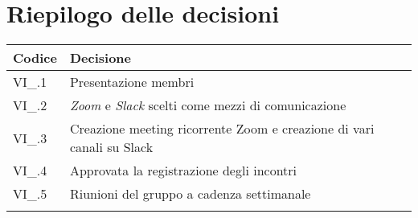 \section{Riepilogo delle decisioni \hfil}
{
	\setlength{\freewidth}{\dimexpr\textwidth-4\tabcolsep}
	\renewcommand{\arraystretch}{1.5}
	\setlength{\aboverulesep}{0pt}
	\setlength{\belowrulesep}{0pt}
	\begin{longtable}{L{.3\freewidth} L{.7\freewidth}}
		\toprule 
		\textbf{Codice} & \textbf{Decisione}\\
		\toprule
		\endhead
		
		VI\_\DataMeeting{}.1 & Presentazione membri \\  
		VI\_\DataMeeting{}.2 & \textit{Zoom} e \textit{Slack} scelti come mezzi di comunicazione \\ 
		VI\_\DataMeeting{}.3 & Creazione meeting ricorrente Zoom e creazione di vari canali su Slack \\
		VI\_\DataMeeting{}.4 & Approvata la registrazione degli incontri \\  
		VI\_\DataMeeting{}.5 & Riunioni del gruppo a cadenza settimanale \\
		
		
		\bottomrule
		\hiderowcolors
	\end{longtable}
}
